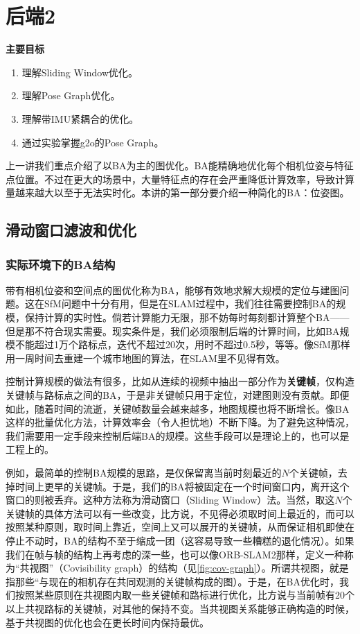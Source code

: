 \chapter{后端2}
\begin{mdframed}  
	\textbf{主要目标}
	\begin{enumerate}[labelindent=0em,leftmargin=1.5em]
		\item 理解Sliding Window优化。
		\item 理解Pose Graph优化。
		\item 理解带IMU紧耦合的优化。
		\item 通过实验掌握g2o的Pose Graph。
	\end{enumerate}
\end{mdframed}

上一讲我们重点介绍了以BA为主的图优化。BA能精确地优化每个相机位姿与特征点位置。不过在更大的场景中，大量特征点的存在会严重降低计算效率，导致计算量越来越大以至于无法实时化。本讲的第一部分要介绍一种简化的BA：位姿图。

\newpage
\section{滑动窗口滤波和优化}
\subsection{实际环境下的BA结构}
带有相机位姿和空间点的图优化称为BA，能够有效地求解大规模的定位与建图问题。这在SfM问题中十分有用，但是在SLAM过程中，我们往往需要控制BA的规模，保持计算的实时性。倘若计算能力无限，那不妨每时每刻都计算整个BA——但是那不符合现实需要。现实条件是，我们必须限制后端的计算时间，比如BA规模不能超过1万个路标点，迭代不超过20次，用时不超过0.5秒，等等。像SfM那样用一周时间去重建一个城市地图的算法，在SLAM里不见得有效。

控制计算规模的做法有很多，比如从连续的视频中抽出一部分作为\textbf{关键帧}\textsuperscript{\cite{Leutenegger2015}}，仅构造关键帧与路标点之间的BA，于是非关键帧只用于定位，对建图则没有贡献。即便如此，随着时间的流逝，关键帧数量会越来越多，地图规模也将不断增长。像BA这样的批量优化方法，计算效率会（令人担忧地）不断下降。为了避免这种情况，我们需要用一定手段来控制后端BA的规模。这些手段可以是理论上的，也可以是工程上的。

例如，最简单的控制BA规模的思路，是仅保留离当前时刻最近的$N$个关键帧，去掉时间上更早的关键帧。于是，我们的BA将被固定在一个时间窗口内，离开这个窗口的则被丢弃。这种方法称为滑动窗口（Sliding Window）法\textsuperscript{\cite{Sibley2008}}。当然，取这$N$个关键帧的具体方法可以有一些改变，比方说，不见得必须取时间上最近的，而可以按照某种原则，取时间上靠近，空间上又可以展开的关键帧，从而保证相机即使在停止不动时，BA的结构不至于缩成一团（这容易导致一些糟糕的退化情况）。如果我们在帧与帧的结构上再考虑的深一些，也可以像ORB-SLAM2\textsuperscript{\cite{Mur-Artal2015}}那样，定义一种称为“共视图”（Covisibility graph）的结构（见\autoref{fig:cov-graph}）。所谓共视图，就是指那些“与现在的相机存在共同观测的关键帧构成的图）。于是，在BA优化时，我们按照某些原则在共视图内取一些关键帧和路标进行优化，比方说与当前帧有20个以上共视路标的关键帧，对其他的保持不变。当共视图关系能够正确构造的时候，基于共视图的优化也会在更长时间内保持最优。

